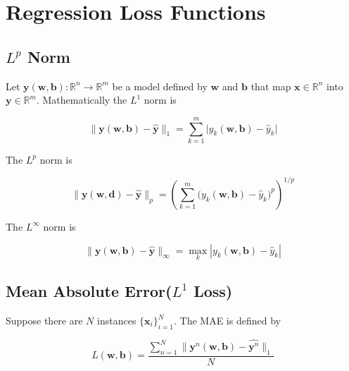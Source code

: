 \documentclass{article}
\begin{document}
    \section*{Regression Loss Functions}

        \subsection*{\texorpdfstring{$L^p$}{Lp} Norm}

            Let $\boldsymbol{y}(\boldsymbol{w},\boldsymbol{b}): \mathbb{R}^n
            \rightarrow \mathbb{R}^m$ be a model defined by $\boldsymbol{w}$
            and $\boldsymbol{b}$ that map $\boldsymbol{x} \in \mathbb{R}^n$
            into $\boldsymbol{y} \in \mathbb{R}^m$. Mathematically the $L^1$
            norm is

            \begin{equation*}
                \| \boldsymbol{y}(\boldsymbol{w},\boldsymbol{b}) -
                \hat{\boldsymbol{y}} \|_1 = \sum_{k=1}^m \big|
                y_k(\boldsymbol{w},\boldsymbol{b}) - \hat{y}_k \big| 
            \end{equation*}

            The $L^p$ norm is

            \begin{equation*}
                \| \boldsymbol{y}(\boldsymbol{w},\boldsymbol{d}) -
                \hat{\boldsymbol{y}}\|_p = \left( \sum_{k=1}^m
                \big(y_k(\boldsymbol{w},\boldsymbol{b})-\hat{y}_k\big)^p \right)^{1/p}
            \end{equation*}

            The $L^\infty$ norm is

            \begin{equation*}
                \| \boldsymbol{y}(\boldsymbol{w}, \boldsymbol{b}) -
                \hat{\boldsymbol{y}}\|_{\infty} = \max_{k}
                |y_k(\boldsymbol{w},\boldsymbol{b}) - \hat{y}_k| 
            \end{equation*}

        \subsection*{Mean Absolute Error(\texorpdfstring{$L^1$}{L1} Loss)}

            Suppose there are $N$ instances $\{ \boldsymbol{x}_i \}_{i=1}^N$. The MAE is defined by

            \begin{equation*}
                L(\boldsymbol{w},\boldsymbol{b}) = \frac{\sum_{n=1}^N \|
                \boldsymbol{y}^n(\boldsymbol{w},\boldsymbol{b}) -
                \hat{\boldsymbol{y}^n} \|_1}{N}
            \end{equation*}
\end{document}
